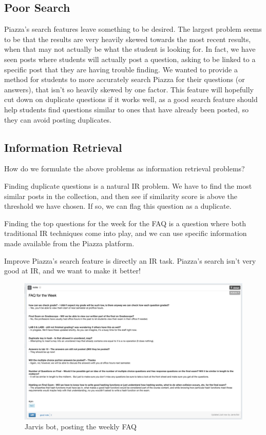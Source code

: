 \documentclass[sigconf]{acmart}
\begin{document}
\subsection{Poor Search}
Piazza's search features leave something to be desired. The largest problem seems to be that the results are very heavily skewed towards the most recent results, when that may not actually be what the student is looking for. In fact, we have seen posts where students will actually post a question, asking to be linked to a specific post that they are having trouble finding. We wanted to provide a method for students to more accurately search Piazza for their questions (or answers), that isn't so heavily skewed by one factor. This feature will hopefully cut down on duplicate questions if it works well, as a good search feature should help students find questions similar to ones that have already been posted, so they can avoid posting duplicates.

\subsection{Information Retrieval}
How do we formulate the above problems as information retrieval problems?

Finding duplicate questions is a natural IR problem. We have to find the most similar posts in the collection, and then see if similarity score is above the threshold we have chosen. If so, we can flag this question as a duplicate.

Finding the top questions for the week for the FAQ is a question where both traditional IR techniques come into play, and we can use specific information made available from the Piazza platform.

Improve Piazza's search feature is directly an IR task. Piazza's search isn't very good at IR, and we want to make it better!


\begin{figure}
\includegraphics[width=\textwidth]{faq}
\caption{Jarvis bot, posting the weekly FAQ}
\end{figure}
\end{document}
